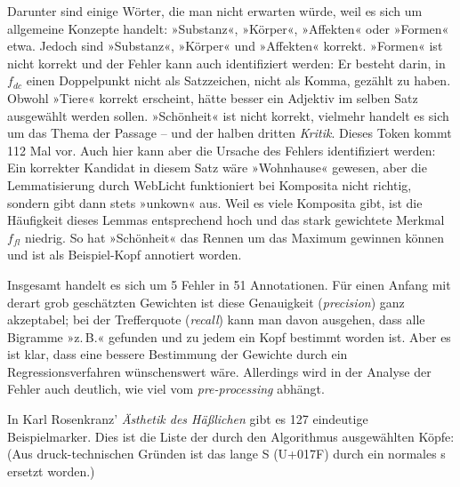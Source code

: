 \documentclass{article}
\newcommand*{\lit}{\textit}%
\newcommand*{\englisch}[1]{\foreignlanguage{english}{\textit{#1}}}%
\begin{document}
Darunter sind einige Wörter, die man nicht erwarten würde, weil es
sich um allgemeine Konzepte handelt: »Substanz«, »Körper«, »Affekten«
oder »Formen« etwa. Jedoch sind »Substanz«, »Körper« und »Affekten«
korrekt. »Formen« ist nicht korrekt und der Fehler kann auch
identifiziert werden: Er besteht darin, in $f_{dc}$ einen Doppelpunkt
nicht als Satzzeichen, nicht als Komma, gezählt zu haben. Obwohl
»Tiere« korrekt erscheint, hätte besser ein Adjektiv im selben Satz
ausgewählt werden sollen. »Schönheit« ist nicht korrekt, vielmehr
handelt es sich um das Thema der Passage -- und der halben dritten
\lit{Kritik}. Dieses Token kommt 112 Mal vor. Auch hier kann aber die
Ursache des Fehlers identifiziert werden: Ein korrekter Kandidat in
diesem Satz wäre »Wohnhause« gewesen, aber die Lemmatisierung durch
WebLicht funktioniert bei Komposita nicht richtig, sondern gibt dann
stets »unkown« aus. Weil es viele Komposita gibt, ist die Häufigkeit
dieses Lemmas entsprechend hoch und das stark gewichtete Merkmal
$f_{fl}$ niedrig. So hat »Schönheit« das Rennen um das Maximum
gewinnen können und ist als Beispiel-Kopf annotiert worden.

Insgesamt handelt es sich um 5 Fehler in 51 Annotationen. Für einen
Anfang mit derart grob geschätzten Gewichten ist diese Genauigkeit
(\englisch{precision}) ganz akzeptabel; bei der Trefferquote
(\englisch{recall}) kann man davon ausgehen, dass alle Bigramme
»z.\,B.« gefunden und zu jedem ein Kopf
bestimmt worden ist. Aber es ist klar, dass eine bessere Bestimmung
der Gewichte durch ein Regressionsverfahren wünschenswert
wäre. Allerdings wird in der Analyse der Fehler auch deutlich, wie
viel vom \englisch{pre-processing} abhängt.


In Karl Rosenkranz' \lit{Ästhetik des
  Häßlichen} \parencite{Rosenkranz1853a} gibt es 127 eindeutige
Beispielmarker. Dies ist die Liste der durch den Algorithmus
ausgewählten Köpfe: (Aus druck-technischen Gründen ist das lange S
(U+017F) durch ein normales s ersetzt worden.)
\end{document}
